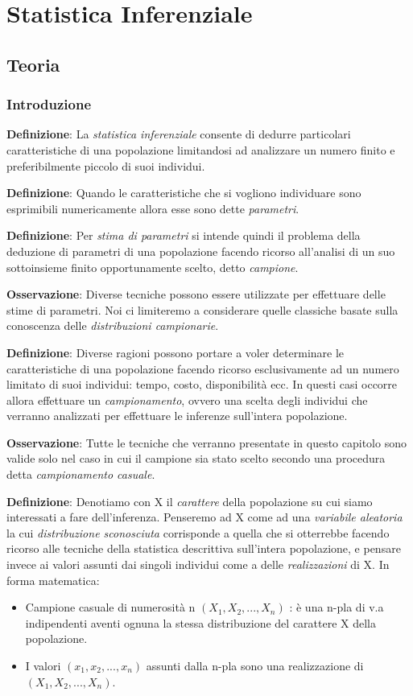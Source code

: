 \chapter{Statistica Inferenziale}

\section{Teoria}

\subsection{Introduzione}

\textbf{Definizione}: La \textit{statistica inferenziale} consente di dedurre particolari caratteristiche di una popolazione limitandosi ad analizzare un numero finito e preferibilmente piccolo di suoi individui. \n

\ind \textbf{Definizione}: Quando le caratteristiche che si vogliono individuare sono esprimibili numericamente allora esse sono dette \textit{parametri}. \n

\ind \textbf{Definizione}: Per \textit{stima di parametri} si intende quindi il problema della deduzione di parametri di una popolazione facendo ricorso all’analisi di un suo
sottoinsieme finito opportunamente scelto, detto \textit{campione}. \n

\ind \textbf{Osservazione}: Diverse tecniche possono essere utilizzate per effettuare delle stime di parametri. Noi ci limiteremo a considerare quelle classiche basate sulla conoscenza delle \textit{distribuzioni campionarie}. \n

\ind \textbf{Definizione}: Diverse ragioni possono portare a voler determinare le caratteristiche di una popolazione facendo ricorso esclusivamente ad un numero limitato di suoi individui: tempo, costo, disponibilità ecc. In questi casi occorre allora effettuare un \textit{campionamento}, ovvero una scelta degli individui che verranno analizzati per effettuare le inferenze sull’intera popolazione. \n

\ind \textbf{Osservazione}: Tutte le tecniche che verranno presentate in questo capitolo sono valide solo nel caso in cui il campione sia stato scelto secondo una procedura detta \textit{campionamento casuale}. \n

\ind \textbf{Definizione}: Denotiamo con X il \textit{carattere} della popolazione su cui siamo interessati a fare dell’inferenza. Penseremo ad X come ad una \textit{variabile aleatoria} la cui \textit{distribuzione sconosciuta} corrisponde a quella che si otterrebbe facendo ricorso alle tecniche della statistica descrittiva sull'intera popolazione, e pensare invece ai valori assunti dai singoli individui come a delle \textit{realizzazioni} di X. In forma matematica:
\begin{itemize}
    \item Campione casuale di numerosità n $(X_1, X_2, ..., X_n)$ : è una n-pla di v.a indipendenti aventi ognuna la stessa distribuzione del carattere X della popolazione. 
    \item I valori $(x_1, x_2, ..., x_n) $ assunti dalla n-pla sono una realizzazione di $(X_1, X_2, ..., X_n)$.
\end{itemize}

